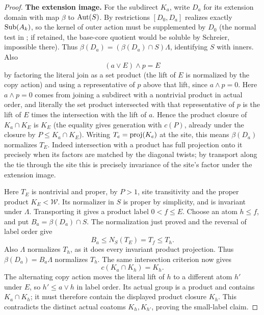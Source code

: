 \begin{proof}
\noindent\textbf{The extension image.} For the subdirect \(K_a\), write \(D_a\) for its extension domain with map \(\beta\) to \({\rm Aut}(S)\). By restrictions \([D_0,D_a]\) realizes exactly \({\rm Sub}(A_k)\), so the kernel of outer action must be supplemented by \(D_0\) (the normal test in ; if retained, the base-core quotient would be soluble by Schreier, impossible there). Thus \(\beta(D_a)=(\beta(D_a)\cap S)\Lambda\), identifying \(S\) with inners. Also
\[
                   (a\vee E)\wedge p=E
\]
by factoring the literal join as a set product (the lift of \(E\) is normalized by the copy
action) and using a representative of \(p\) above that lift, since \(a\wedge p=0\). Here \(a\wedge
p=0\) comes from joining a subdirect with a nontrivial product in actual order, and literally the
set product intersected with that representative of \(p\) is the lift of \(E\) times the
intersection with the lift of \(a\). Hence the product closure of \(K_a\cap K_E\) is \(K_E\) (the
equality gives generation with \(c(P)\), already under the closure by \(P\le K_a\cap K_E\)).
Writing \(T_e={\rm proj}(K_e)\) at the site, this means \(\beta(D_a)\) normalizes \(T_E\). Indeed
intersection with a product has full projection onto it precisely when its factors are matched by
the diagonal twists; by transport along the tie through the site this is precisely invariance of
the site's factor under the extension image.

Here \(T_E\) is nontrivial and proper, by \(P>1\), site transitivity
and the proper product \(K_E<\mathcal W\).  Its normalizer in \(S\)
is proper by simplicity, and is invariant under \(\Lambda\).  Transporting
it gives a product label \(0<f\le E\).  Choose an atom \(h\le f\),
and put \(B_a=\beta(D_a)\cap S\).  The normalization just proved and
the reversal of label order give
\[
 B_a\le N_S(T_E)=T_f\le T_h.
\]
Also \(\Lambda\) normalizes \(T_h\), as it does every invariant
product projection.  Thus
\(\beta(D_a)=B_a\Lambda\) normalizes \(T_h\).  The same
intersection criterion now gives
\[
 c(K_a\cap K_h)=K_h.
\]
The alternating copy action moves the literal lift of \(h\) to a
different atom \(h'\) under \(E\), so \(h'\le a\vee h\) in label
order.  Its actual group is a product and contains \(K_a\cap K_h\);
it must therefore contain the displayed product closure \(K_h\).
This contradicts the distinct actual coatoms \(K_h,K_{h'}\), proving
the small-label claim.


\end{proof}
